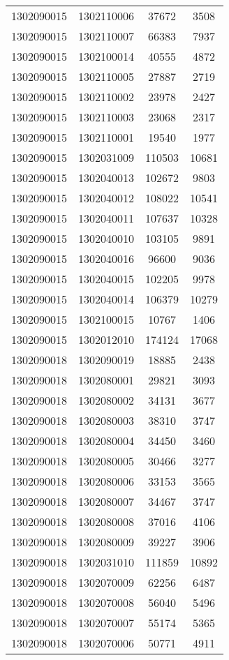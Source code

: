 \begin{longtable}{llcc}
1302090015 & 1302110006 & 37672 & 3508\\
1302090015 & 1302110007 & 66383 & 7937\\
1302090015 & 1302100014 & 40555 & 4872\\
1302090015 & 1302110005 & 27887 & 2719\\
1302090015 & 1302110002 & 23978 & 2427\\
1302090015 & 1302110003 & 23068 & 2317\\
1302090015 & 1302110001 & 19540 & 1977\\
1302090015 & 1302031009 & 110503 & 10681\\
1302090015 & 1302040013 & 102672 & 9803\\
1302090015 & 1302040012 & 108022 & 10541\\
1302090015 & 1302040011 & 107637 & 10328\\
1302090015 & 1302040010 & 103105 & 9891\\
1302090015 & 1302040016 & 96600 & 9036\\
1302090015 & 1302040015 & 102205 & 9978\\
1302090015 & 1302040014 & 106379 & 10279\\
1302090015 & 1302100015 & 10767 & 1406\\
1302090015 & 1302012010 & 174124 & 17068\\
1302090018 & 1302090019 & 18885 & 2438\\
1302090018 & 1302080001 & 29821 & 3093\\
1302090018 & 1302080002 & 34131 & 3677\\
1302090018 & 1302080003 & 38310 & 3747\\
1302090018 & 1302080004 & 34450 & 3460\\
1302090018 & 1302080005 & 30466 & 3277\\
1302090018 & 1302080006 & 33153 & 3565\\
1302090018 & 1302080007 & 34467 & 3747\\
1302090018 & 1302080008 & 37016 & 4106\\
1302090018 & 1302080009 & 39227 & 3906\\
1302090018 & 1302031010 & 111859 & 10892\\
1302090018 & 1302070009 & 62256 & 6487\\
1302090018 & 1302070008 & 56040 & 5496\\
1302090018 & 1302070007 & 55174 & 5365\\
1302090018 & 1302070006 & 50771 & 4911\\

\end{longtable}
